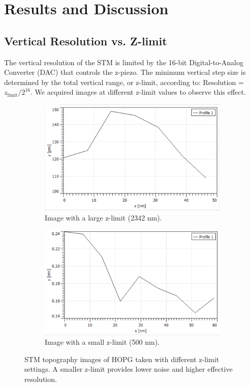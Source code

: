 \documentclass[12pt,a4paper]{article}
\begin{document}
\section{Results and Discussion}

\subsection{Vertical Resolution vs. Z-limit}
The vertical resolution of the STM is limited by the 16-bit Digital-to-Analog Converter (DAC) that controls the z-piezo. The minimum vertical step size is determined by the total vertical range, or z-limit, according to: Resolution = $z_{\text{limit}} / 2^{16}$. We acquired images at different z-limit values to observe this effect.

\begin{figure}[H]
    \centering
    \begin{subfigure}[b]{0.48\linewidth}
        \centering
        \includegraphics[width=\linewidth]{../data/tasks/1/2342nm.PNG}
        \caption{Image with a large z-limit (2342 nm).}
        \label{fig:high_z_limit_image}
    \end{subfigure}\hfill
    \begin{subfigure}[b]{0.48\linewidth}
        \centering
        \includegraphics[width=\linewidth]{../data/tasks/1/500nm.PNG}
        \caption{Image with a small z-limit (500 nm).}
        \label{fig:low_z_limit_image}
    \end{subfigure}
    \caption{STM topography images of HOPG taken with different z-limit settings. A smaller z-limit provides lower noise and higher effective resolution.}
    \label{fig:z-limit}
\end{figure}
\end{document}
